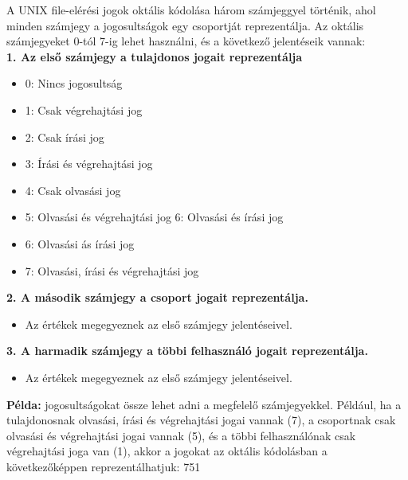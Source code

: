 \documentclass[11pt,a4paper]{article}
\begin{document}
            \begin{tcolorbox}[colback=blue!5!white,colframe=blue!50!black,title= 37. Ismertesse a UNIX file-elérési jogok oktális kódolását!]
                                        A UNIX file-elérési jogok oktális kódolása három számjeggyel történik, ahol minden számjegy a jogosultságok egy csoportját reprezentálja. Az oktális számjegyeket 0-tól 7-ig lehet használni, és a következő jelentéseik vannak:\\
                                        \textbf{1. Az első számjegy a tulajdonos jogait reprezentálja}    
                                        \begin{itemize}
                                            \item 0: Nincs jogosultság
                                            \item 1: Csak végrehajtási jog
                                            \item 2: Csak írási jog
                                            \item 3: Írási és végrehajtási jog
                                            \item 4: Csak olvasási jog
                                            \item 5: Olvasási és végrehajtási jog 6: Olvasási és írási jog
                                            \item 6: Olvasási ás írási jog
                                            \item 7: Olvasási, írási és végrehajtási jog
                                        \end{itemize}
                                        \textbf{2. A második számjegy a csoport jogait reprezentálja.}
                                        \begin{itemize}
                                            \item Az értékek megegyeznek az első számjegy jelentéseivel.
                                        \end{itemize}
                                        \textbf{3. A harmadik számjegy a többi felhasználó jogait reprezentálja.}
                                        \begin{itemize}
                                            \item Az értékek megegyeznek az első számjegy jelentéseivel.
                                        \end{itemize}
                                        \textbf{Példa:} jogosultságokat össze lehet adni a megfelelő számjegyekkel. Például, ha a tulajdonosnak olvasási, írási és végrehajtási jogai vannak (7), a csoportnak csak olvasási és végrehajtási jogai vannak (5), és a többi felhasználónak csak végrehajtási joga van (1), akkor a jogokat az oktális kódolásban a következőképpen reprezentálhatjuk: 751\\
            \end{tcolorbox}
                                    
\end{document}
